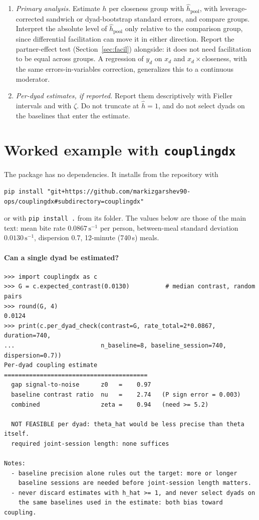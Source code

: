 \documentclass[12pt]{article}
\theoremstyle{definition}
\begin{document}
\begin{enumerate}
not be estimated, since both cancel.
\item \emph{Primary analysis.} Estimate $h$ per closeness group with
$\hat h_{\mathrm{pool}}$, with leverage-corrected sandwich or dyad-bootstrap
standard errors, and compare groups. Interpret the absolute level of
$\hat h_{\mathrm{pool}}$ only relative to the comparison group, since differential
facilitation can move it in either direction. Report the partner-effect test
(Section~\ref{sec:facil}) alongside: it does not need facilitation to be equal
across groups. A regression of $y_d$ on $x_d$ and $x_d\times$closeness, with the
same errors-in-variables correction, generalizes this to a continuous moderator.
\item \emph{Per-dyad estimates, if reported.} Report them descriptively with
Fieller intervals and with $\zeta$. Do not truncate at $\hat h=1$, and do not
select dyads on the baselines that enter the estimate.
\end{enumerate}

\section{Worked example with \texttt{couplingdx}}

The package has no dependencies. It installs from the repository with
\begin{verbatim}
pip install "git+https://github.com/markizgarshev90-ops/couplingdx#subdirectory=couplingdx"
\end{verbatim}
or with \texttt{pip install .} from its folder. The values below are those of the
main text: mean bite rate $0.0867\,\mathrm{s}^{-1}$ per person, between-meal
standard deviation $0.0130\,\mathrm{s}^{-1}$, dispersion 0.7, 12-minute (740\,s)
meals.

\paragraph{Can a single dyad be estimated?}
\begin{verbatim}
>>> import couplingdx as c
>>> G = c.expected_contrast(0.0130)          # median contrast, random pairs
>>> round(G, 4)
0.0124
>>> print(c.per_dyad_check(contrast=G, rate_total=2*0.0867, duration=740,
...                        n_baseline=8, baseline_session=740, dispersion=0.7))
Per-dyad coupling estimate
========================================
  gap signal-to-noise      z0   =    0.97
  baseline contrast ratio  nu   =    2.74   (P sign error = 0.003)
  combined                 zeta =    0.94   (need >= 5.2)

  NOT FEASIBLE per dyad: theta_hat would be less precise than theta itself.
  required joint-session length: none suffices

Notes:
  - baseline precision alone rules out the target: more or longer
    baseline sessions are needed before joint-session length matters.
  - never discard estimates with h_hat >= 1, and never select dyads on
    the same baselines used in the estimate: both bias toward coupling.
\end{verbatim}
\end{document}
